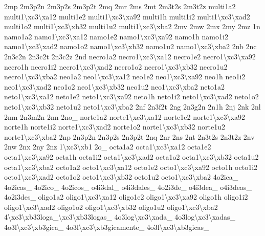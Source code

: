 \begin{DoxyCompactItemize}
2mp 2m3p2n 2m3p2s 2m3p2t 2mq 2mr 2ms 2mt 2m3t2s 2m3t2z multi1a2 multi1\textbackslash{}xc3\textbackslash{}xa12 multi1e2 multi1\textbackslash{}xc3\textbackslash{}xa92 multi1h multi1i2 multi1\textbackslash{}xc3\textbackslash{}xad2 multi1o2 multi1\textbackslash{}xc3\textbackslash{}xb32 multi1u2 multi1\textbackslash{}xc3\textbackslash{}xba2 2mv 2mw 2mx 2my 2mz 1n namo1a2 namo1\textbackslash{}xc3\textbackslash{}xa12 namo1e2 namo1\textbackslash{}xc3\textbackslash{}xa92 namo1h namo1i2 namo1\textbackslash{}xc3\textbackslash{}xad2 namo1o2 namo1\textbackslash{}xc3\textbackslash{}xb32 namo1u2 namo1\textbackslash{}xc3\textbackslash{}xba2 2nb 2nc 2n3c2n 2n3c2t 2n3c2z 2nd necro1a2 necro1\textbackslash{}xc3\textbackslash{}xa12 necro1e2 necro1\textbackslash{}xc3\textbackslash{}xa92 necro1h necro1i2 necro1\textbackslash{}xc3\textbackslash{}xad2 necro1o2 necro1\textbackslash{}xc3\textbackslash{}xb32 necro1u2 necro1\textbackslash{}xc3\textbackslash{}xba2 neo1a2 neo1\textbackslash{}xc3\textbackslash{}xa12 neo1e2 neo1\textbackslash{}xc3\textbackslash{}xa92 neo1h neo1i2 neo1\textbackslash{}xc3\textbackslash{}xad2 neo1o2 neo1\textbackslash{}xc3\textbackslash{}xb32 neo1u2 neo1\textbackslash{}xc3\textbackslash{}xba2 neto1a2 neto1\textbackslash{}xc3\textbackslash{}xa12 neto1e2 neto1\textbackslash{}xc3\textbackslash{}xa92 neto1h neto1i2 neto1\textbackslash{}xc3\textbackslash{}xad2 neto1o2 neto1\textbackslash{}xc3\textbackslash{}xb32 neto1u2 neto1\textbackslash{}xc3\textbackslash{}xba2 2nf 2n3f2t 2ng 2n3g2n 2n1h 2nj 2nk 2nl 2nm 2n3m2n 2nn 2no\-\_\- norte1a2 norte1\textbackslash{}xc3\textbackslash{}xa12 norte1e2 norte1\textbackslash{}xc3\textbackslash{}xa92 norte1h norte1i2 norte1\textbackslash{}xc3\textbackslash{}xad2 norte1o2 norte1\textbackslash{}xc3\textbackslash{}xb32 norte1u2 norte1\textbackslash{}xc3\textbackslash{}xba2 2np 2n3p2n 2n3p2s 2n3p2t 2nq 2nr 2ns 2nt 2n3t2s 2n3t2z 2nv 2nw 2nx 2ny 2nz 1\textbackslash{}xc3\textbackslash{}xb1 2o\-\_\- octa1a2 octa1\textbackslash{}xc3\textbackslash{}xa12 octa1e2 octa1\textbackslash{}xc3\textbackslash{}xa92 octa1h octa1i2 octa1\textbackslash{}xc3\textbackslash{}xad2 octa1o2 octa1\textbackslash{}xc3\textbackslash{}xb32 octa1u2 octa1\textbackslash{}xc3\textbackslash{}xba2 octo1a2 octo1\textbackslash{}xc3\textbackslash{}xa12 octo1e2 octo1\textbackslash{}xc3\textbackslash{}xa92 octo1h octo1i2 octo1\textbackslash{}xc3\textbackslash{}xad2 octo1o2 octo1\textbackslash{}xc3\textbackslash{}xb32 octo1u2 octo1\textbackslash{}xc3\textbackslash{}xba2 4o2ica\-\_\- 4o2icas\-\_\- 4o2ico\-\_\- 4o2icos\-\_\- o4i3dal\-\_\- o4i3dales\-\_\- 4o2i3de\-\_\- o4i3dea\-\_\- o4i3deas\-\_\- 4o2i3des\-\_\- oligo1a2 oligo1\textbackslash{}xc3\textbackslash{}xa12 oligo1e2 oligo1\textbackslash{}xc3\textbackslash{}xa92 oligo1h oligo1i2 oligo1\textbackslash{}xc3\textbackslash{}xad2 oligo1o2 oligo1\textbackslash{}xc3\textbackslash{}xb32 oligo1u2 oligo1\textbackslash{}xc3\textbackslash{}xba2 4\textbackslash{}xc3\textbackslash{}xb33loga\-\_\textbackslash{}xc3\textbackslash{}xb33logas\-\_\- 4o3log\textbackslash{}xc3\textbackslash{}xada\-\_\- 4o3log\textbackslash{}xc3\textbackslash{}xadas\-\_\- 4o3l\textbackslash{}xc3\textbackslash{}xb3gica\-\_\- 4o3l\textbackslash{}xc3\textbackslash{}xb3gicamente\-\_\- 4o3l\textbackslash{}xc3\textbackslash{}xb3gicas\-\_\- 
\end{DoxyCompactItemize}
